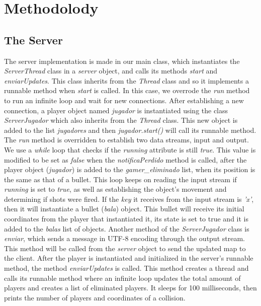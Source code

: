 \documentclass[10pt,a4paper]{article}
\theoremstyle{definition}
\begin{document}
\section{Methodolody}
\subsection{The Server}
The server implementation is made in our main class, which instantiates the \textit{ServerThread} class in a \textit{server} object, and calls its methods \textit{start} and \textit{enviarUpdates}. 
This class inherits from the \textit{Thread} class and so it implements a runnable method when \textit{start} is called. 
In this case, we overrode the \textit{run} method to run an infinite loop and wait for new connections. 
After establishing a new connection, a player object named \textit{jugador} is instantiated using the class \textit{ServerJugador} which also inherits from the \textit{Thread} class. 
This new object is added to the list \textit{jugadores} and then \textit{jugador.start()} will call its runnable method. 
The \textit{run} method is overridden to establish two data streams, input and output. 
We use a \textit{while} loop that checks if the \textit{running} attribute is still \textit{true}. 
This value is modified to be set as \textit{false} when the \textit{notificaPerdido} method is called, after the player object (\textit{jugador}) is added to the \textit{gamer\_eliminado} list, when its position is the same as that of a bullet. 
This loop keeps on reading the input stream if \textit{running} is set to \textit{true}, as well as establishing the object's movement and determining if shots were fired. 
If the \textit{key} it receives from the input stream is \textit{'x'}, then it will instantiate a bullet (\textit{bala}) object. 
This bullet will receive its initial coordinates from the player that instantiated it, its state is set to true and it is added to the \textit{balas} list of objects. 
Another method of the \textit{ServerJugador} class is \textit{enviar}, which sends a message in UTF-8 encoding through the output stream. 
This method will be called from the \textit{server} object to send the updated map to the client. 
After the player is instantiated and initialized in the server's runnable method, the method \textit{enviarUpdates} is called. 
This method creates a thread and calls its runnable method where an infinite loop updates the total amount of players and creates a list of eliminated players. 
It sleeps for 100 milliseconds, then prints the number of players and coordinates of a collision. 
\end{document}
